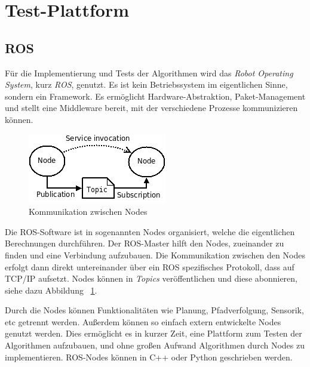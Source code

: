 \documentclass[11pt,a4paper]{article}
\begin{document}
{\section{Test-Plattform}
\subsection{ROS}

	F\"ur die Implementierung und Tests der Algorithmen wird das \textit{Robot Operating System}, kurz \textit{ROS}, genutzt. Es ist kein Betriebssystem im eigentlichen Sinne, sondern ein Framework. Es erm\"oglicht Hardware-Abstraktion, Paket-Management und stellt eine Middleware bereit, mit der verschiedene Prozesse kommunizieren k\"onnen. \cite{rosWiki}

	\begin{figure}[h]
		\includegraphics[width=\linewidth]{pictures/ROS_basic_concepts.png}
		\caption{Kommunikation zwischen Nodes ~\cite{nodesPic} \label{fig:rosNodes}}
	\end{figure}

	Die ROS-Software ist in sogenannten Nodes organisiert, welche die eigentlichen Berechnungen durchf\"uhren. Der ROS-Master hilft den Nodes, zueinander zu finden und eine Verbindung aufzubauen. Die Kommunikation zwischen den Nodes erfolgt dann direkt untereinander \"uber ein ROS spezifisches Protokoll, dass auf TCP/IP aufsetzt. Nodes k\"onnen in \textit{Topics} ver\"offentlichen und diese abonnieren, siehe dazu Abbildung ~\ref{fig:rosNodes}. \cite{rosConcepts}


	Durch die Nodes k\"onnen Funktionalit\"aten wie Planung, Pfadverfolgung, Sensorik, etc getrennt werden. Au{\ss}erdem k\"onnen so einfach extern entwickelte Nodes genutzt werden. Dies erm\"oglicht es in kurzer Zeit, eine Plattform zum Testen der Algorithmen aufzubauen, und ohne gro{\ss}en Aufwand Algorithmen durch Nodes zu implementieren. ROS-Nodes k\"onnen in C++ oder Python geschrieben werden.

}
\end{document}
